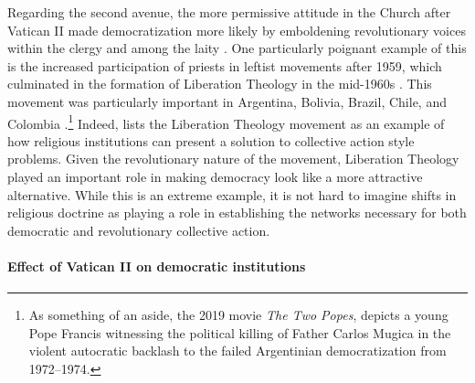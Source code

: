 \documentclass[12pt]{article}
\numberwithin{equation}{section}
\begin{document}
\label{par:liberation_theology}
Regarding the second avenue, the more permissive attitude in the Church after Vatican II made democratization more likely by emboldening revolutionary voices within the clergy and among the laity \citep*{Guiso2003, Guiso2006}. One particularly poignant example of this is the increased participation of priests in leftist movements after 1959, which culminated in the formation of Liberation Theology in the mid-1960s \citep{Buschges2021}. This movement was particularly important in Argentina, Bolivia, Brazil, Chile, and Colombia \citep{Berryman1973}.\footnote{As something of an aside, the 2019 movie \textit{The Two Popes}, depicts a young Pope Francis witnessing the political killing of Father Carlos Mugica in the violent autocratic backlash to the failed Argentinian democratization from 1972--1974.} Indeed, \cite{Moore1995} lists the Liberation Theology movement as an example of how religious institutions can present a solution to collective action style problems. Given the revolutionary nature of the movement, Liberation Theology played an important role in making democracy look like a more attractive alternative. While this is an extreme example, it is not hard to imagine shifts in religious doctrine as playing a role in establishing the networks necessary for both democratic and revolutionary collective action.


\paragraph{Effect of Vatican II on democratic institutions}
\end{document}
